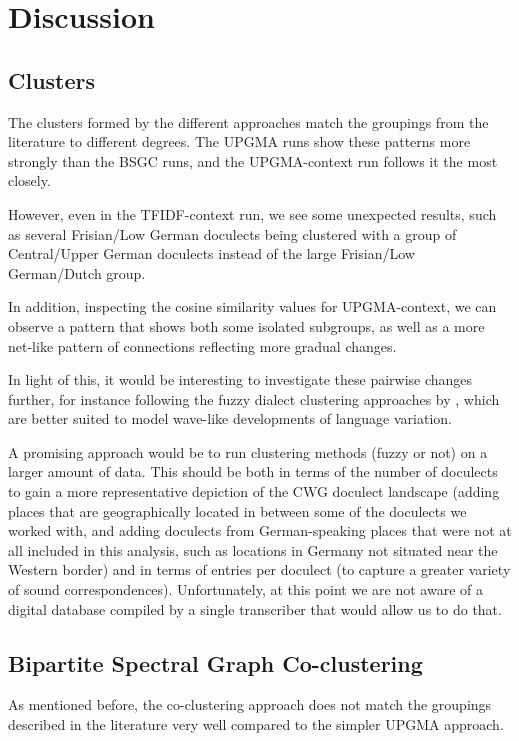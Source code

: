 \documentclass[a4paper]{article}
\begin{document}
\section{Discussion}
\label{sec:discussion}

\subsection{Clusters}
The clusters formed by the different approaches
match the groupings from the literature to different degrees.
The UPGMA runs show these patterns more strongly than the BSGC runs,
and the UPGMA-context run follows it the most closely.

However, even in the TFIDF-context run,
we see some unexpected results,
such as several Frisian/Low German doculects
being clustered with a group of Central/Upper German doculects
instead of the large Frisian/Low German/Dutch group.

In addition, inspecting the cosine similarity values
for UPGMA-context, we can observe a pattern
that shows both some isolated subgroups, as well as
a more net-like pattern of connections
reflecting more gradual changes.

In light of this, it would be interesting
to investigate these pairwise changes further,
for instance following the fuzzy dialect clustering approaches
by \citet{proell2013detecting}, which are better suited to model
wave-like developments of language variation.

A promising approach would be to run
clustering methods (fuzzy or not) on a larger amount of data.
This should be both in terms of the number of doculects
to gain a more representative depiction of the CWG doculect landscape
(adding places that are geographically located
in between some of the doculects we worked with,
and adding doculects from German-speaking places that
were not at all included in this analysis, such as
locations in Germany not situated near the Western border)
and in terms of entries per doculect
(to capture a greater variety of sound correspondences).
Unfortunately, at this point we are not aware of
a digital database compiled by a single transcriber that
would allow us to do that.

\subsection{Bipartite Spectral Graph Co-clustering}

As mentioned before, the co-clustering approach
does not match the groupings described in the literature very well
compared to the simpler UPGMA approach.
\end{document}
